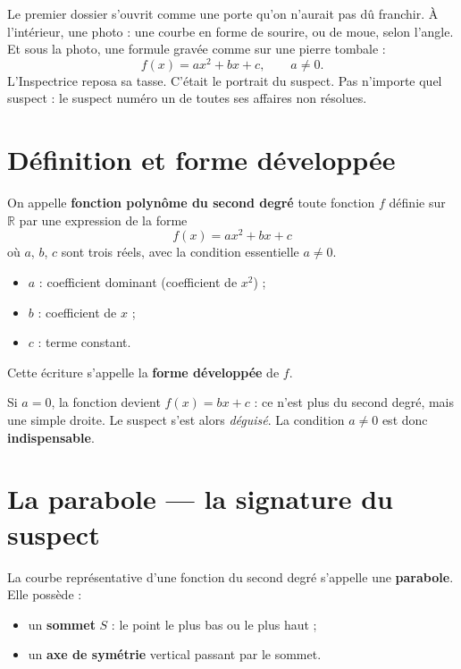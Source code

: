 \documentclass[11pt,a4paper]{article}
\begin{document}
Le premier dossier s'ouvrit comme une porte qu'on n'aurait pas dû franchir. À l'intérieur, une photo : une courbe en forme de sourire, ou de moue, selon l'angle. Et sous la photo, une formule gravée comme sur une pierre tombale :
\[
  f(x) = ax^2 + bx + c, \qquad a \neq 0.
\]
L'Inspectrice reposa sa tasse. C'était le portrait du suspect. Pas n'importe quel suspect : le suspect numéro un de toutes ses affaires non résolues.

\section{Définition et forme développée}

\begin{indice}
On appelle \textbf{fonction polynôme du second degré} toute fonction $f$ définie sur $\mathbb{R}$ par une expression de la forme
\[
  \boxed{\;f(x) = ax^2 + bx + c\;}
\]
où $a$, $b$, $c$ sont trois réels, avec la condition essentielle $a \neq 0$.
\begin{itemize}[leftmargin=*]
  \item $a$ : coefficient dominant (coefficient de $x^2$) ;
  \item $b$ : coefficient de $x$ ;
  \item $c$ : terme constant.
\end{itemize}
Cette écriture s'appelle la \textbf{forme développée} de $f$.
\end{indice}

\begin{alerte}
Si $a = 0$, la fonction devient $f(x) = bx + c$ : ce n'est plus du second degré, mais une simple droite. Le suspect s'est alors \emph{déguisé}. La condition $a \neq 0$ est donc \textbf{indispensable}.
\end{alerte}

\section{La parabole — la signature du suspect}

\begin{indice}
La courbe représentative d'une fonction du second degré s'appelle une \textbf{parabole}. Elle possède :
\begin{itemize}[leftmargin=*]
  \item un \textbf{sommet} $S$ : le point le plus bas ou le plus haut ;
  \item un \textbf{axe de symétrie} vertical passant par le sommet.
\end{itemize}
\end{indice}
\end{document}
